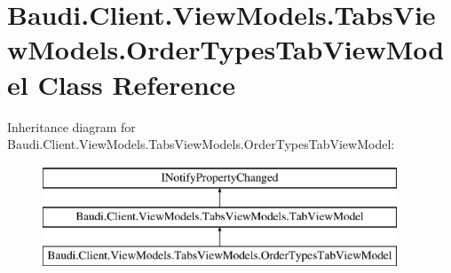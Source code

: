 \hypertarget{class_baudi_1_1_client_1_1_view_models_1_1_tabs_view_models_1_1_order_types_tab_view_model}{}\section{Baudi.\+Client.\+View\+Models.\+Tabs\+View\+Models.\+Order\+Types\+Tab\+View\+Model Class Reference}
\label{class_baudi_1_1_client_1_1_view_models_1_1_tabs_view_models_1_1_order_types_tab_view_model}
Inheritance diagram for Baudi.\+Client.\+View\+Models.\+Tabs\+View\+Models.\+Order\+Types\+Tab\+View\+Model\+:\begin{figure}[H]
\begin{center}
\leavevmode
\includegraphics[height=3.000000cm]{class_baudi_1_1_client_1_1_view_models_1_1_tabs_view_models_1_1_order_types_tab_view_model}
\end{center}
\end{figure}
